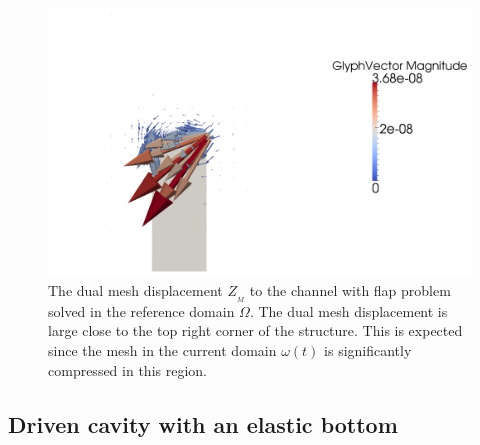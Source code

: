 \begin{figure}
  \centering
  \includegraphics[width=\largefig]{chapters/selim/png/channelZM.png}
  \caption{The dual mesh displacement $Z_{_{M}}$ to the channel with
    flap problem solved in the reference domain $\Omega$. The dual mesh
      displacement is large close to the top right corner of the
      structure. This is expected since the mesh in the current domain
      $\omega(t)$ is significantly compressed in this region.}
  \label{selim:fig:dual_channel_2}
\end{figure}

\subsection{Driven cavity with an elastic bottom}

